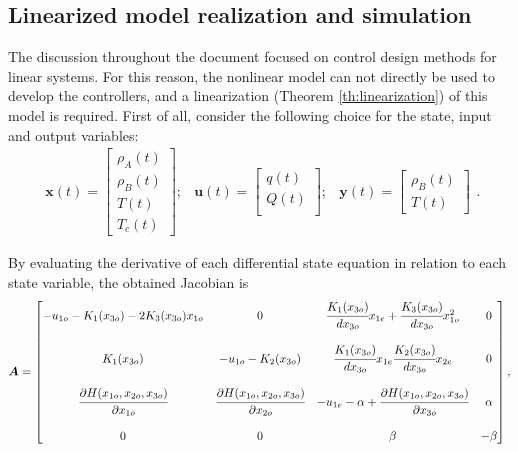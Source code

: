 \documentclass[a4paper,11pt]{book}
\numberwithin{figure}{chapter}
\numberwithin{equation}{chapter}
\numberwithin{table}{chapter}
\theoremstyle{definition}
\begin{document}
\subsection{Linearized model realization and simulation}

The discussion throughout the document focused on control design methods for linear systems. For this reason, the nonlinear model can not directly be used to develop the controllers, and a linearization (Theorem \ref{th:linearization}) of this model is required. First of all, consider the following choice for the state, input and output variables:
\begin{equation}
\begin{matrix}
	\bm{x}(t) = \begin{bmatrix}
		\rho_A(t) \\ 
		\rho_B(t) \\ 
		T(t) \\ 
		T_c(t)
	\end{bmatrix}; & \bm{u}(t) = \begin{bmatrix}
		q(t) \\ 
		Q(t) \\
	\end{bmatrix}; & \bm{y}(t) = \begin{bmatrix}
		\rho_B(t) \\ 
		T(t)
	\end{bmatrix}
\end{matrix}
.\end{equation}

By evaluating the derivative of each differential state equation in relation to each state variable, the obtained Jacobian is
\begin{equation} \label{eq:exoLinSS01}
	\bm{A} = \begin{bmatrix}
		-u_{1o} - K_1(x_{3o}) - 2K_3(x_{3o}) x_{1o} & 0 & \cfrac{K_1(x_{3o})}{d x_{3o}} x_{1e} + \cfrac{K_3(x_{3o})}{d x_{3o}} x_{1o}^2 & 0 \\ \\
		K_1(x_{3o}) 					 & -u_{1o} - K_2(x_{3o}) & \cfrac{K_1(x_{3o})}{d x_{3o}} x_{1e} \cfrac{K_2(x_{3o})}{d x_{3o}} x_{2e} & 0 \\ \\
		\cfrac{\partial H(x_{1o},x_{2o},x_{3o})}{\partial x_{1o}} & \cfrac{\partial H(x_{1o},x_{2o},x_{3o})}{\partial x_{2o}} & -u_{1e} - \alpha + \cfrac{\partial H(x_{1o},x_{2o},x_{3o})}{\partial x_{3o}} & \alpha \\ \\
		0 & 0 & \beta & -\beta \\
	\end{bmatrix}
,\end{equation} 
\end{document}
